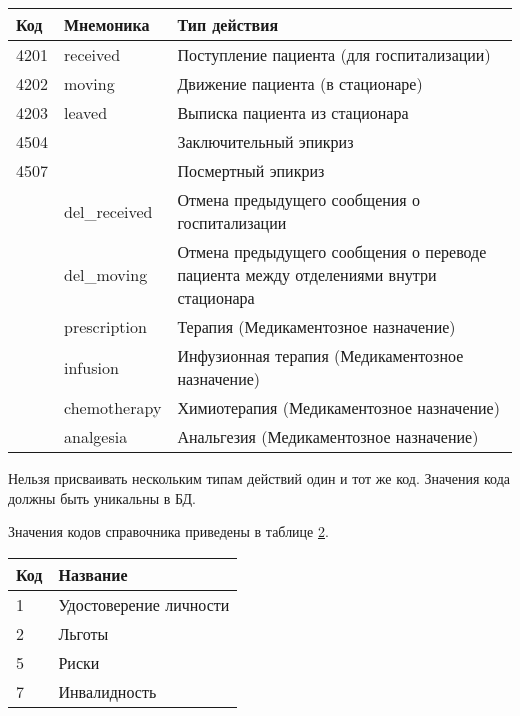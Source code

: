{\small
\begin{table}
 \label{tbl_spr_tpact_kod} 
 \begin{tabular}{|p{1.5 cm}|p{3cm}|p{12.2cm}|}
  \hline \rule{0pt}{15pt} \centering \textbf{Код} & \centering \textbf{Мнемоника} & \hfil \textbf{Тип действия} \\ \hline
  4201 &	received	& Поступление пациента (для госпитализации) \\ \hline 
  4202 &	moving	& Движение пациента (в стационаре) \\ \hline
  4203	& leaved	& Выписка пациента из стационара \\ \hline
  4504	& & Заключительный эпикриз  \\ \hline
  4507	& & Посмертный эпикриз  \\ \hline
  	& del\_received	& Отмена предыдущего сообщения о госпитализации \\ \hline
  	& del\_moving &	Отмена предыдущего сообщения о переводе пациента между отделениями внутри стационара  \\ \hline
  	& prescription &	Терапия (Медикаментозное назначение) \\ \hline
  	& infusion	& Инфузионная терапия (Медикаментозное назначение) \\ \hline
  	& chemotherapy	& Химиотерапия (Медикаментозное назначение) \\ \hline
  	& analgesia	& Анальгезия (Медикаментозное назначение) \\ \hline
 \end{tabular}
\end{table}
}

\begin{vnim}
Нельзя присваивать нескольким типам действий один и тот же код. Значения кода должны быть уникальны в БД.
\end{vnim}

Значения кодов справочника  приведены в таблице \ref{tbl_spr_grdoc_kod}.

{\small
\begin{table}
 \label{tbl_spr_grdoc_kod} 
 \begin{tabular}{|p{2 cm}|p{15cm}|}
  \hline \rule{0pt}{15pt} \centering \textbf{Код} & \hfil \textbf{Название} \\ \hline
  1	& Удостоверение личности  \\ \hline
  2	& Льготы \\ \hline
  5	& Риски \\ \hline
  7	& Инвалидность \\ \hline
 \end{tabular}
\end{table}
}

